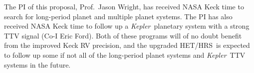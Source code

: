 \documentclass[12pt]{article}
\def\kepler{{\it Kepler}}
\def\hrs{HET/HRS}
\begin{document}
The PI of this proposal, Prof.~Jason Wright, has received NASA Keck
time to search for long-period planet and multiple planet systems.
The PI has also received NASA Keck time to follow up a
\kepler\ planetary system with a strong TTV signal (Co-I Eric
Ford). Both of these programs will of no doubt benefit from the
improved Keck RV precision, and the upgraded \hrs\ is expected to
follow up some if not all of the long-period planet systems and
\kepler\ TTV systems in the future.


\vspace{-3pt}
{\small %
 }
\end{document}
